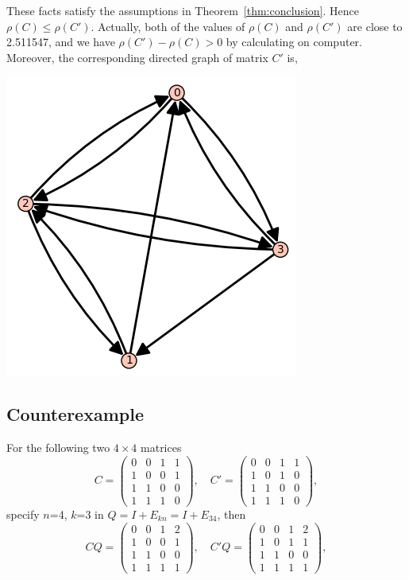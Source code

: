 \documentclass[12pt, a4paper]{article}
\theoremstyle{plain}
\theoremstyle{definition}
\begin{document}
    These facts satisfy the assumptions in Theorem~\ref{thm:conclusion}. Hence $\rho(C)\leq\rho(C')$. Actually, both of
     the values of $\rho(C)$ and $\rho(C')$ are close to 2.511547, and we have $\rho(C')-\rho(C)>0$ by calculating on
     computer.\cite[sage]{sage}
    Moreover, the corresponding directed graph of matrix $C'$ is, \cite[sage]{sage}
    \begin{center}
    \includegraphics{graph_Cprime.PNG}
    \end{center}



\subsection{Counterexample}
    For the following two $4\times 4$ matrices
    $$C=\begin{pmatrix}
    0 & 0 & 1 & 1\\
    1 & 0 & 0 & 1\\
    1 & 1 & 0 & 0\\
    1 & 1 & 1 & 0
    \end{pmatrix},\quad C'=\begin{pmatrix}
    0 & 0 & 1 & 1\\
    1 & 0 & 1 &  0\\
    1 & 1 & 0 & 0\\
    1 & 1 & 1 & 0
    \end{pmatrix},$$
    specify $n$=4, $k$=3 in $Q = I +E_{kn} = I + E_{34}$, then
    $$CQ=\begin{pmatrix}
    0 & 0 & 1 & 2\\
    1 & 0 & 0 & 1\\
    1 & 1 & 0 & 0\\
    1 & 1 & 1 & 1
    \end{pmatrix},\quad C'Q=\begin{pmatrix}
    0 & 0 & 1 & 2\\
    1 & 0 & 1 & 1\\
    1 & 1 & 0 & 0\\
    1 & 1 & 1 & 1
    \end{pmatrix},$$
\end{document}

